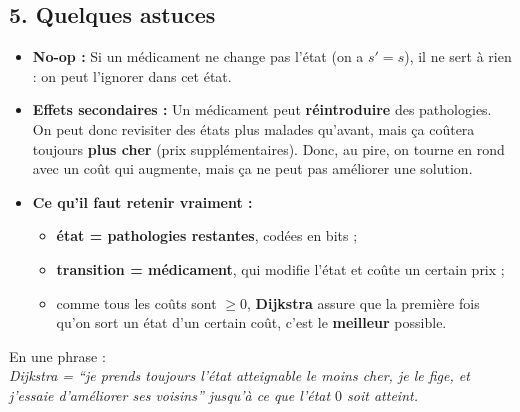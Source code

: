\subsection*{5. Quelques astuces}

\begin{itemize}[leftmargin=1.4em,itemsep=0.3em]
  \item \textbf{No-op :}  
  Si un médicament ne change pas l’état (on a $s' = s$), il ne sert à rien : on peut l’ignorer dans cet état.

  \item \textbf{Effets secondaires :}  
  Un médicament peut \textbf{réintroduire} des pathologies.  
  On peut donc revisiter des états plus \og malades\fg{} qu’avant, mais ça coûtera toujours \textbf{plus cher} (prix supplémentaires).  
  Donc, au pire, on tourne en rond avec un coût qui augmente, mais ça ne peut pas améliorer une solution.

  \item \textbf{Ce qu’il faut retenir vraiment :}
  \begin{itemize}
      \item \textbf{état = pathologies restantes}, codées en bits ;
      \item \textbf{transition = médicament}, qui modifie l’état et coûte un certain prix ;
      \item comme tous les coûts sont $\ge 0$, \textbf{Dijkstra} assure que la première fois qu’on sort un état d’un certain coût, c’est le \textbf{meilleur} possible.
  \end{itemize}
\end{itemize}

En une phrase : \\
\emph{Dijkstra = “je prends toujours l’état atteignable le moins cher, je le fige, et j’essaie d’améliorer ses voisins” jusqu’à ce que l’état \(0\) soit atteint.}